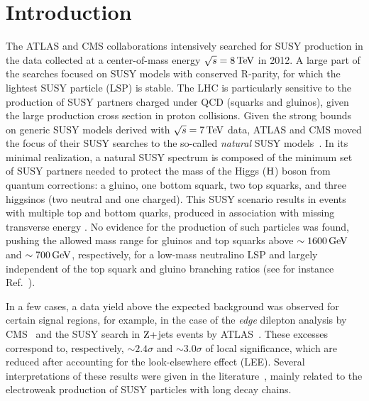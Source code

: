 \section{Introduction}
 
The ATLAS and CMS collaborations intensively searched for SUSY production in the data collected at a center-of-mass energy $\sqrt{s}=8 \,\text{Te\hspace{-.08em}V}$ in 2012. A large part of the searches focused on SUSY models with conserved R-parity, for which the lightest SUSY particle (LSP) is stable. The LHC is particularly sensitive to the production of SUSY partners charged under QCD (squarks and gluinos), given the large production cross section in proton collisions. Given the strong bounds on generic SUSY models derived with $\sqrt{s}=7 \,\text{Te\hspace{-.08em}V}$ data, ATLAS and CMS moved the focus of their SUSY searches to the so-called \textit{natural} SUSY models~\cite{Papucci:2011wy}. In its minimal realization, a natural SUSY spectrum is composed of the minimum set of SUSY partners needed to protect the mass of the Higgs ($\mathrm{H}$) boson from quantum corrections: a gluino, one bottom squark, two top squarks, and three higgsinos (two neutral and one charged). This SUSY scenario results in events with multiple top and bottom quarks, produced in association with missing transverse energy \met. No evidence for the production of such particles was found, pushing the allowed mass range for gluinos and top
squarks above $\sim 1600 \,\text{Ge\hspace{-.08em}V}$ and $\sim 700 \,\text{Ge\hspace{-.08em}V}$, respectively, for a low-mass neutralino LSP and largely independent of the top squark and
gluino branching ratios (see for instance Ref.~\cite{razor8TeV,CMS-PAS-SUS-15-004}). 

In a few cases, a data yield above the expected background was
observed for certain signal regions, for example, in the case of the
\emph{edge} dilepton analysis by CMS~\cite{CMSedge} and the SUSY
search in $\mathrm{Z}+$jets events by ATLAS~\cite{ATLASZpeak}. These excesses
correspond to, respectively, $\sim 2.4\sigma$ and $\sim 3.0\sigma$ of
local significance, which are reduced after accounting for the
look-elsewhere effect (LEE). Several interpretations of these results
were given in the literature~\cite{Theory1,Theory2,Theory3,Theory4,Theory5,Theory6},
mainly related to the electroweak production of SUSY particles with long decay chains. 

